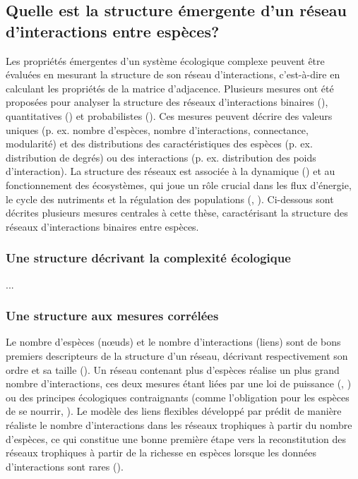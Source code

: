 \subsection{Quelle est la structure émergente d'un réseau d'interactions entre espèces?} 

Les propriétés émergentes d'un système écologique complexe peuvent être évaluées
en mesurant la structure de son réseau d'interactions, c'est-à-dire en calculant
les propriétés de la matrice d'adjacence. Plusieurs mesures ont été proposées
pour analyser la structure des réseaux d'interactions binaires
(\cite{Delmas2019Analysing}), quantitatives (\cite{Bersier2002Quantitative}) et
probabilistes (\cite{Poisot2016Structure}). Ces mesures peuvent décrire des
valeurs uniques (p. ex. nombre d'espèces, nombre d'interactions, connectance,
modularité) et des distributions des caractéristiques des espèces (p. ex.
distribution de degrés) ou des interactions (p. ex. distribution des poids
d'interaction). La structure des réseaux est associée à la dynamique
(\cite{Pascual2006Ecologicala}) et au fonctionnement des écosystèmes, qui joue
un rôle crucial dans les flux d'énergie, le cycle des nutriments et la
régulation des populations (\cite{McCann2011Food}, \cite{Thompson2012Food}).
Ci-dessous sont décrites plusieurs mesures centrales à cette thèse,
caractérisant la structure des réseaux d'interactions binaires entre espèces.

\subsubsection{Une structure décrivant la complexité écologique} 

...

\subsubsection{Une structure aux mesures corrélées} 

Le nombre d'espèces (nœuds) et le nombre d'interactions (liens) sont de bons
premiers descripteurs de la structure d'un réseau, décrivant respectivement son
ordre et sa taille (\cite{Delmas2019Analysing}). Un réseau contenant plus
d'espèces réalise un plus grand nombre d'interactions, ces deux mesures étant
liées par une loi de puissance (\cite{Brose2004Unified},
\cite{Riede2010Chapter}) ou des principes écologiques contraignants (comme
l'obligation pour les espèces de se nourrir, \cite{MacDonald2020Revisiting}). Le
modèle des liens flexibles développé par \cite{MacDonald2020Revisiting} prédit
de manière réaliste le nombre d'interactions dans les réseaux trophiques à
partir du nombre d'espèces, ce qui constitue une bonne première étape vers la
reconstitution des réseaux trophiques à partir de la richesse en espèces lorsque
les données d'interactions sont rares (\cite{Strydom2021Roadmapa}). 

